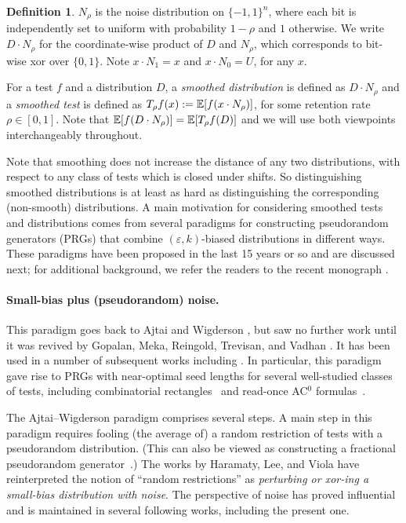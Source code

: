 \documentclass[10pt,a4paper]{article}
\theoremstyle{definition}
\newtheorem{definition}[theorem]{Definition}
\newcommand{\E}{\mathop{\mathbb{E}\/}}
\newcommand{\eps}{\epsilon}
\newcommand{\pmo}{\{-1,1\}}
\def\epsilon{\varepsilon}
\begin{document}
\begin{definition}
$N_\rho$ is the noise distribution on $\pmo^n$, where each bit is independently set to uniform with probability $1-\rho$ and $1$ otherwise.  We write $D \cdot N_\rho$ for the coordinate-wise product of $D$ and $N_\rho$, which corresponds to bit-wise xor over $\{0,1\}$.
Note $x \cdot N_1 = x$ and $x \cdot N_0 = U$, for any $x$.

\end{definition}

For a test $f$ and a distribution $D$, a \emph{smoothed distribution} is defined as $D \cdot N_\rho$ and a \emph{smoothed test} is defined as $T_\rho f (x) := \E[f(x \cdot N_\rho)]$, for some retention rate $\rho \in [0,1]$.
Note that $\E[f(D\cdot N_\rho)] = \E[T_\rho f(D)]$ and we will use both viewpoints interchangeably throughout.

Note that smoothing does not increase the distance of any two distributions, with respect to any class of tests which is closed under shifts.  So distinguishing smoothed distributions is at least as hard as distinguishing the corresponding (non-smooth) distributions.
A main motivation for considering smoothed tests and distributions comes from several paradigms for constructing pseudorandom generators (PRGs) that combine $(\eps,k)$-biased distributions in different
ways.  These paradigms have been proposed in the last 15 years or so and are discussed next; for additional background, we refer the readers to the recent monograph \cite{DBLP:journals/eccc/HatamiH23}.

\paragraph{Small-bias plus (pseudorandom) noise.}
This paradigm goes back to Ajtai and Wigderson \cite{AjtaiW89}, but saw no further work until it was revived by Gopalan, Meka, Reingold, Trevisan, and Vadhan \cite{GopalanMRTV12}. It has been used in a number
of subsequent works including \cite{GavinskyLS12,ReingoldSV13,SVW17,HLV-bipnfp,LeeV-rop,CHRT18,ForbesKelley-2018,MRT19,Lee19,DBLP:conf/coco/DoronHH20,CLTW23}.
In particular, this paradigm gave rise to PRGs with near-optimal seed lengths for several well-studied classes of tests, including combinatorial rectangles~\cite{GopalanMRTV12,Lee19} and read-once AC$^0$ formulas~\cite{DHH19,DBLP:conf/coco/DoronHH20}.

The Ajtai--Wigderson paradigm comprises several steps.
A main step in this paradigm requires fooling (the average of) a random restriction of tests with a pseudorandom distribution.
(This can also be viewed as constructing a fractional pseudorandom generator~\cite{CHHL19,CHLT19,CGLSS21}.)
The works by Haramaty, Lee, and Viola \cite{LV-sum,HLV-bipnfp,LeeV-rop,Lee19}
have reinterpreted the notion of ``random restrictions'' as \emph{perturbing or xor-ing a small-bias distribution with noise}.
The perspective of noise has proved influential and is maintained in several following works, including the present one.
\end{document}
